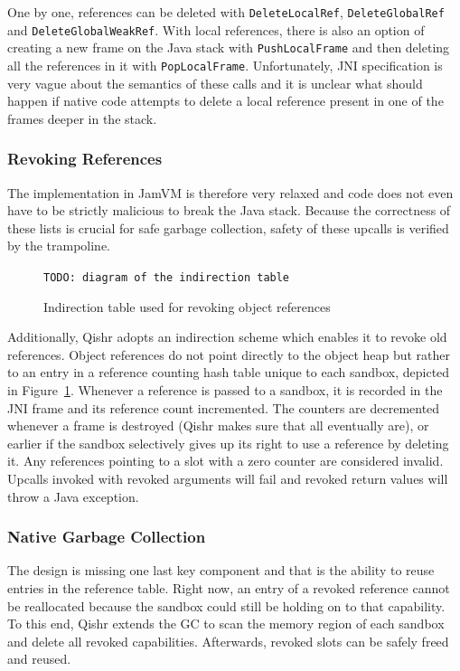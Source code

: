 \documentclass[a4paper,12pt,twoside,openright]{report}
\begin{document}
One by one, references can be deleted with \texttt{DeleteLocalRef}, \texttt{DeleteGlobalRef} and \texttt{DeleteGlobalWeakRef}. With local references, there is also an option of creating a new frame on the Java stack with \texttt{PushLocalFrame} and then deleting all the references in it with \texttt{PopLocalFrame}. Unfortunately, JNI specification is very vague about the semantics of these calls and it is unclear what should happen if native code attempts to delete a local reference present in one of the frames deeper in the stack.

\subsubsection{Revoking References}

The implementation in JamVM is therefore very relaxed and code does not even have to be strictly malicious to break the Java stack. Because the correctness of these lists is crucial for safe garbage collection, safety of these upcalls is verified by the trampoline.

\begin{figure}
	\centering
	\texttt{TODO: diagram of the indirection table}
	\caption{Indirection table used for revoking object references}
	\label{fig:IndirectionTable}
\end{figure}

Additionally, Qishr adopts an indirection scheme which enables it to revoke old references. Object references do not point directly to the object heap but rather to an entry in a reference counting hash table unique to each sandbox, depicted in Figure~\ref{fig:IndirectionTable}. Whenever a reference is passed to a sandbox, it is recorded in the JNI frame and its reference count incremented. The counters are decremented whenever a frame is destroyed (Qishr makes sure that all eventually are), or earlier if the sandbox selectively gives up its right to use a reference by deleting it. Any references pointing to a slot with a zero counter are considered invalid. Upcalls invoked with revoked arguments will fail and revoked return values will throw a Java exception.

\subsubsection{Native Garbage Collection}

The design is missing one last key component and that is the ability to reuse entries in the reference table. Right now, an entry of a revoked reference cannot be reallocated because the sandbox could still be holding on to that capability. To this end, Qishr extends the GC to scan the memory region of each sandbox and delete all revoked capabilities. Afterwards, revoked slots can be safely freed and reused.
\end{document}
